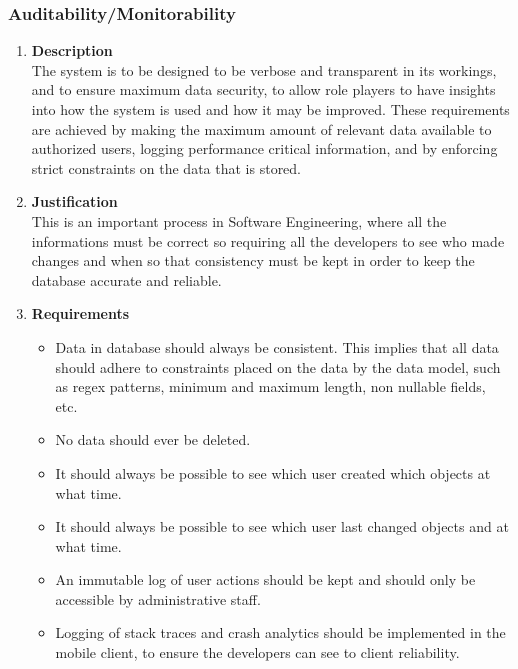 \documentclass[a4paper,10pt]{article}
\begin{document}
	\subsubsection{Auditability/Monitorability}
		\begin{enumerate}
			\item \textbf{Description} \\
			The system is to be designed to be verbose and transparent in its workings, and to ensure maximum data security, to allow role players to have insights into how the system is used and how it may be improved. These requirements are achieved by making the maximum amount of relevant data available to authorized users, logging performance critical information, and by enforcing strict constraints on the data that is stored. 

			\item \textbf{Justification} \\
			This is an important process in Software Engineering, where all the informations must be correct so requiring all the developers to see who made changes and when so that consistency must be kept in order to keep the database accurate and reliable.

			\item \textbf{Requirements}\\
				\begin{itemize}
					\item Data in database should always be consistent. This implies that all data should adhere to constraints placed on the data by the data model, such as regex patterns, minimum and maximum length, non nullable fields, etc.
					\item No data should ever be deleted.
					\item It should always be possible to see which user created which objects at what time.
					\item It should always be possible to see which user last changed objects and at what time.
					\item An immutable log of user actions should be kept and should only be accessible by administrative staff.
					\item Logging of stack traces and crash analytics should be implemented in the mobile client, to ensure the developers can see to client reliability.
				\end{itemize}
		\end{enumerate}
\end{document}
